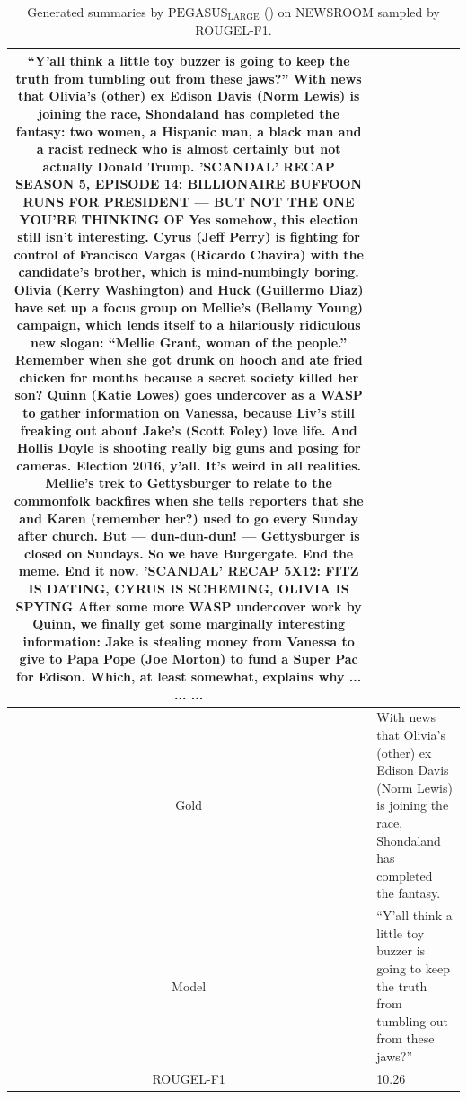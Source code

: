 \begin{table}[bth!]
\begin{tabular}{c|p{}}
“Y'all think a little toy buzzer is going to keep the truth from tumbling out from these jaws?” With news that Olivia's (other) ex Edison Davis (Norm Lewis) is joining the race, Shondaland has completed the fantasy: two women, a Hispanic man, a black man and a racist redneck who is almost certainly but not actually Donald Trump. 'SCANDAL' RECAP SEASON 5, EPISODE 14: BILLIONAIRE BUFFOON RUNS FOR PRESIDENT — BUT NOT THE ONE YOU'RE THINKING OF Yes somehow, this election still isn't interesting. Cyrus (Jeff Perry) is fighting for control of Francisco Vargas (Ricardo Chavira) with the candidate's brother, which is mind-numbingly boring. Olivia (Kerry Washington) and Huck (Guillermo Diaz) have set up a focus group on Mellie's (Bellamy Young) campaign, which lends itself to a hilariously ridiculous new slogan: “Mellie Grant, woman of the people.” Remember when she got drunk on hooch and ate fried chicken for months because a secret society killed her son? Quinn (Katie Lowes) goes undercover as a WASP to gather information on Vanessa, because Liv's still freaking out about Jake's (Scott Foley) love life. And Hollis Doyle is shooting really big guns and posing for cameras. Election 2016, y'all. It's weird in all realities. Mellie's trek to Gettysburger to relate to the commonfolk backfires when she tells reporters that she and Karen (remember her?) used to go every Sunday after church. But — dun-dun-dun! — Gettysburger is closed on Sundays. So we have Burgergate. End the meme. End it now. 'SCANDAL' RECAP 5X12: FITZ IS DATING, CYRUS IS SCHEMING, OLIVIA IS SPYING After some more WASP undercover work by Quinn, we finally get some marginally interesting information: Jake is stealing money from Vanessa to give to Papa Pope (Joe Morton) to fund a Super Pac for Edison. Which, at least somewhat, explains why ... ... ... 
\\ \hline
Gold & 
With news that Olivia's (other) ex Edison Davis (Norm Lewis) is joining the race, Shondaland has completed the fantasy.
\\ \hline
Model & 
“Y'all think a little toy buzzer is going to keep the truth from tumbling out from these jaws?”
\\ \hline
ROUGEL-F1 & 
10.26
\\ \hline
\end{tabular}
\caption{Generated summaries by $\text{PEGASUS}_{\text{LARGE}}$ (\gnews) on NEWSROOM sampled by ROUGEL-F1.}
\end{table}
